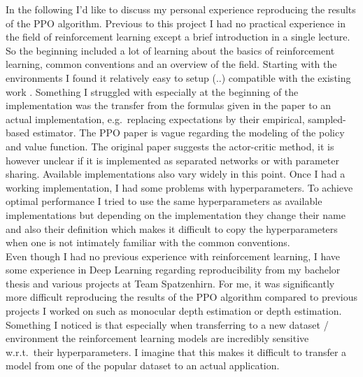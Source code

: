 In the following I'd like to discuss my personal experience reproducing the results of the PPO algorithm.
Previous to this project I had no practical experience in the field of reinforcement learning except a brief introduction in a single lecture.
So the beginning included a lot of learning about the basics of reinforcement learning, common conventions and an overview of the field.
Starting with the environments I found it relatively easy to setup (..) compatible with the existing work . %
Something I struggled with especially at the beginning of the implementation was the transfer from the formulas given in
the paper to an actual implementation, e.g.\ replacing expectations by their empirical, sampled-based estimator.
The PPO paper is vague regarding the modeling of the policy and value function.
The original paper suggests the actor-critic method, it is however unclear if it is implemented as separated networks
or with parameter sharing.
Available implementations also vary widely in this point.
Once I had a working implementation, I had some problems with hyperparameters.
To achieve optimal performance I tried to use the same hyperparameters as available implementations but depending on the
implementation they change their name and also their definition which makes it difficult to copy the hyperparameters
when one is not intimately familiar with the common conventions.\\
Even though I had no previous experience with reinforcement learning, I have some experience in Deep Learning
regarding reproducibility from my bachelor thesis and various projects at Team Spatzenhirn.
For me, it was significantly more difficult reproducing the results of the PPO algorithm compared to previous projects
I worked on such as monocular depth estimation or depth estimation.
Something I noticed is that especially when transferring to a new dataset / environment the reinforcement learning
models are incredibly sensitive w.r.t.\ their hyperparameters.
I imagine that this makes it difficult to transfer a model from one of the popular dataset to an actual application. %
